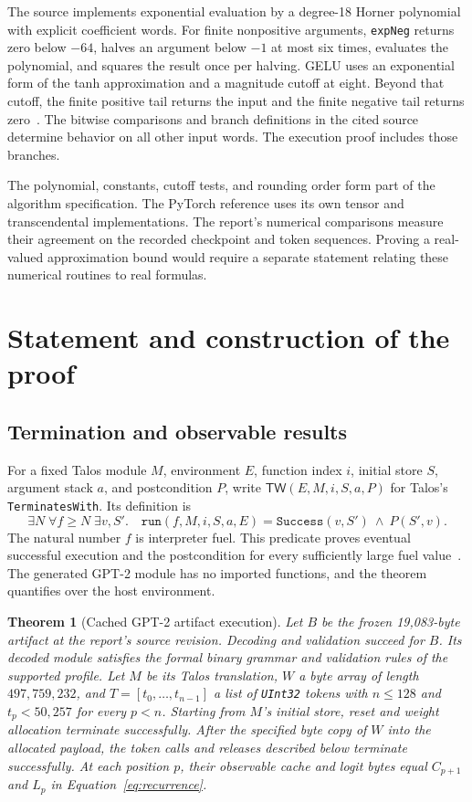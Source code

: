 \documentclass[11pt]{article}
\newcommand{\code}[1]{\texttt{#1}}
\newtheorem{theorem}{Theorem}
\begin{document}
The source implements exponential evaluation by a degree-18 Horner polynomial with explicit coefficient words.  For finite nonpositive arguments, \code{expNeg} returns zero below $-64$, halves an argument below $-1$ at most six times, evaluates the polynomial, and squares the result once per halving.  GELU uses an exponential form of the tanh approximation and a magnitude cutoff at eight.  Beyond that cutoff, the finite positive tail returns the input and the finite negative tail returns zero~\cite{numerics}.  The bitwise comparisons and branch definitions in the cited source determine behavior on all other input words.  The execution proof includes those branches.

The polynomial, constants, cutoff tests, and rounding order form part of the algorithm specification.  The PyTorch reference uses its own tensor and transcendental implementations.  The report's numerical comparisons measure their agreement on the recorded checkpoint and token sequences.  Proving a real-valued approximation bound would require a separate statement relating these numerical routines to real formulas.

\section{Statement and construction of the proof}

\subsection{Termination and observable results}

For a fixed Talos module $M$, environment $E$, function index $i$, initial store $S$, argument stack $a$, and postcondition $P$, write $\mathsf{TW}(E,M,i,S,a,P)$ for Talos's \code{TerminatesWith}.  Its definition is
\[
\exists N\;\forall f\geq N\;\exists v,S'.\quad
\code{run}(f,M,i,S,a,E)=\code{Success}(v,S')\ \land\ P(S',v).
\]
The natural number $f$ is interpreter fuel.  This predicate proves eventual successful execution and the postcondition for every sufficiently large fuel value~\cite{termination}.  The generated GPT-2 module has no imported functions, and the theorem quantifies over the host environment.

\begin{theorem}[Cached GPT-2 artifact execution]\label{thm:main}
Let $B$ be the frozen 19,083-byte artifact at the report's source revision.  Decoding and validation succeed for $B$.  Its decoded module satisfies the formal binary grammar and validation rules of the supported profile.  Let $M$ be its Talos translation, $W$ a byte array of length $497{,}759{,}232$, and $T=[t_0,\ldots,t_{n-1}]$ a list of \code{UInt32} tokens with $n\leq128$ and $t_p<50{,}257$ for every $p<n$.  Starting from $M$'s initial store, reset and weight allocation terminate successfully.  After the specified byte copy of $W$ into the allocated payload, the token calls and releases described below terminate successfully.  At each position $p$, their observable cache and logit bytes equal $C_{p+1}$ and $L_p$ in Equation~\eqref{eq:recurrence}.
\end{theorem}
\end{document}
